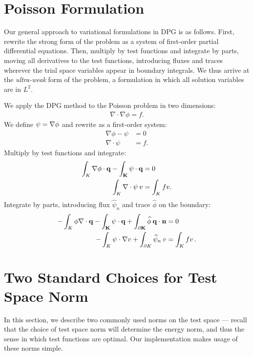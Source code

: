 \section{Poisson Formulation}\label{NVR:sec:poissonForm}
Our general approach to variational formulations in DPG is as follows.  First, rewrite the strong form of the problem as a system of first-order partial differential equations.  Then, multiply by test functions and integrate by parts, moving all derivatives to the test functions, introducing fluxes and traces wherever the trial space variables appear in boundary integrals.  We thus arrive at the \emph{ultra-weak} form of the problem, a formulation in which all solution variables are in $L^{2}$.

We apply the DPG method to the Poisson problem in two dimensions:
\begin{align*}
\nabla \cdot \nabla \phi = f.
\end{align*}
We define $\bf{\psi} = \nabla \phi$ and rewrite as a first-order system:
\begin{align*}
\nabla \phi - \psi &= 0\\
\nabla \cdot \psi &= f.
\end{align*}
Multiply by test functions and integrate:
\begin{align*}
\int_K \nabla \phi \cdot \bf{q} - \int_K \psi \cdot \bf{q} &= 0\\
\int_K \nabla \cdot \psi \: v &= \int_K f v.
\end{align*}
Integrate by parts, introducing flux $\widehat{\psi}_n$ and trace $\widehat{\phi}$ on the boundary:
\begin{align*}
- \int_K \phi \nabla \cdot \bf{q} - \int_K \psi \cdot \bf{q} + \int_{\partial K} \widehat{\phi} \: \bf{q} \cdot \bf{n} &= 0\\
- \int_K \psi \cdot \nabla v + \int_{\partial K} \widehat{\psi}_n \: v &= \int_K f v \,.
\end{align*}

\section{Two Standard Choices for Test Space Norm}\label{NVR:sec:testNorms}
In this section, we describe two commonly used norms on the test space --- recall that the choice of test space norm will determine the energy norm, and thus the sense in which test functions are optimal.  Our implementation makes usage of these norms simple.
